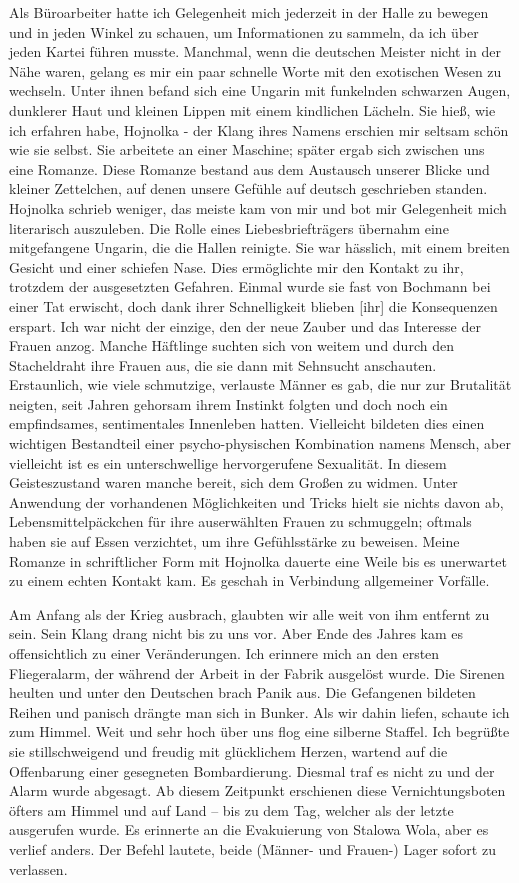Als Büroarbeiter hatte ich Gelegenheit mich jederzeit in der Halle zu bewegen und in jeden Winkel zu schauen, um Informationen zu sammeln, da ich über jeden Kartei führen musste. Manchmal, wenn die deutschen Meister nicht in der Nähe waren, gelang es mir ein paar schnelle Worte mit den exotischen Wesen zu wechseln. Unter ihnen befand sich eine Ungarin mit funkelnden schwarzen Augen, dunklerer Haut und kleinen Lippen mit einem kindlichen Lächeln. Sie hieß, wie ich erfahren habe, Hojnolka - der Klang ihres Namens erschien mir seltsam schön wie sie selbst. Sie arbeitete an einer Maschine; später ergab sich zwischen uns eine Romanze. Diese Romanze bestand aus dem Austausch unserer Blicke und kleiner Zettelchen, auf denen unsere Gefühle auf deutsch geschrieben standen.
Hojnolka schrieb weniger, das meiste kam von mir und bot mir Gelegenheit mich literarisch auszuleben. Die Rolle eines Liebesbriefträgers übernahm eine mitgefangene Ungarin, die die Hallen reinigte. Sie war hässlich, mit einem breiten Gesicht und einer schiefen Nase. Dies ermöglichte mir den Kontakt zu ihr, trotzdem der ausgesetzten Gefahren. Einmal wurde sie fast von Bochmann bei einer Tat erwischt, doch dank ihrer Schnelligkeit blieben [ihr] die Konsequenzen erspart.
Ich war nicht der einzige, den der neue Zauber und das Interesse der Frauen anzog. Manche Häftlinge suchten sich von weitem und durch den Stacheldraht ihre Frauen aus, die sie dann mit Sehnsucht anschauten. Erstaunlich, wie viele schmutzige, verlauste Männer es gab, die nur zur Brutalität neigten, seit Jahren gehorsam ihrem Instinkt folgten und doch noch ein empfindsames, sentimentales Innenleben hatten. Vielleicht bildeten dies einen wichtigen Bestandteil einer psycho-physischen Kombination namens Mensch, aber vielleicht ist es ein unterschwellige hervorgerufene Sexualität. In diesem Geisteszustand waren manche bereit, sich dem Großen zu widmen. Unter Anwendung der vorhandenen Möglichkeiten und Tricks hielt sie nichts davon ab, Lebensmittelpäckchen für ihre auserwählten Frauen zu schmuggeln; oftmals haben sie auf Essen verzichtet, um ihre Gefühlsstärke zu beweisen.
Meine Romanze in schriftlicher Form mit Hojnolka dauerte eine Weile bis es unerwartet zu einem echten Kontakt kam. Es geschah in Verbindung allgemeiner Vorfälle. 

Am Anfang als der Krieg ausbrach, glaubten wir alle weit von ihm entfernt zu sein. Sein Klang drang nicht bis zu uns vor. Aber Ende des Jahres kam es offensichtlich zu einer Veränderungen. Ich erinnere mich an den ersten Fliegeralarm, der während der Arbeit in der Fabrik ausgelöst wurde. Die Sirenen heulten und unter den Deutschen brach Panik aus. Die Gefangenen bildeten Reihen und panisch drängte man sich in Bunker. Als wir dahin liefen, schaute ich zum Himmel. Weit und sehr hoch über uns flog eine silberne Staffel. Ich begrüßte sie stillschweigend und freudig mit glücklichem Herzen, wartend auf die Offenbarung einer gesegneten Bombardierung. Diesmal traf es nicht zu und der Alarm wurde abgesagt. Ab diesem Zeitpunkt erschienen diese Vernichtungsboten öfters am Himmel und auf Land -- bis zu dem Tag, welcher als der letzte ausgerufen wurde.
Es erinnerte an die Evakuierung von Stalowa Wola, aber es verlief anders. Der Befehl lautete, beide (Männer- und Frauen-) Lager sofort zu verlassen.

